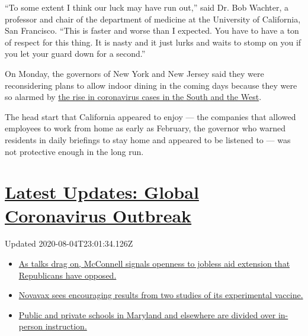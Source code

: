 ``To some extent I think our luck may have run out,'' said Dr. Bob
Wachter, a professor and chair of the department of medicine at the
University of California, San Francisco. ``This is faster and worse than
I expected. You have to have a ton of respect for this thing. It is
nasty and it just lurks and waits to stomp on you if you let your guard
down for a second.''

On Monday, the governors of New York and New Jersey said they were
reconsidering plans to allow indoor dining in the coming days because
they were so alarmed by
\href{https://www.nytimes3xbfgragh.onion/2020/06/14/us/coronavirus-united-states.html}{the
rise in coronavirus cases in the South and the West}.

The head start that California appeared to enjoy --- the companies that
allowed employees to work from home as early as February, the governor
who warned residents in daily briefings to stay home and appeared to be
listened to --- was not protective enough in the long run.

\hypertarget{latest-updates-global-coronavirus-outbreak}{%
\section{\texorpdfstring{\href{https://www.nytimes3xbfgragh.onion/2020/08/04/world/coronavirus-cases.html?action=click\&pgtype=Article\&state=default\&region=MAIN_CONTENT_1\&context=storylines_live_updates}{Latest
Updates: Global Coronavirus
Outbreak}}{Latest Updates: Global Coronavirus Outbreak}}\label{latest-updates-global-coronavirus-outbreak}}

Updated 2020-08-04T23:01:34.126Z

\begin{itemize}
\tightlist
\item
  \href{https://www.nytimes3xbfgragh.onion/2020/08/04/world/coronavirus-cases.html?action=click\&pgtype=Article\&state=default\&region=MAIN_CONTENT_1\&context=storylines_live_updates\#link-2daa96b5}{As
  talks drag on, McConnell signals openness to jobless aid extension
  that Republicans have opposed.}
\item
  \href{https://www.nytimes3xbfgragh.onion/2020/08/04/world/coronavirus-cases.html?action=click\&pgtype=Article\&state=default\&region=MAIN_CONTENT_1\&context=storylines_live_updates\#link-1228a480}{Novavax
  sees encouraging results from two studies of its experimental
  vaccine.}
\item
  \href{https://www.nytimes3xbfgragh.onion/2020/08/04/world/coronavirus-cases.html?action=click\&pgtype=Article\&state=default\&region=MAIN_CONTENT_1\&context=storylines_live_updates\#link-4825b93}{Public
  and private schools in Maryland and elsewhere are divided over
  in-person instruction.}
\end{itemize}

